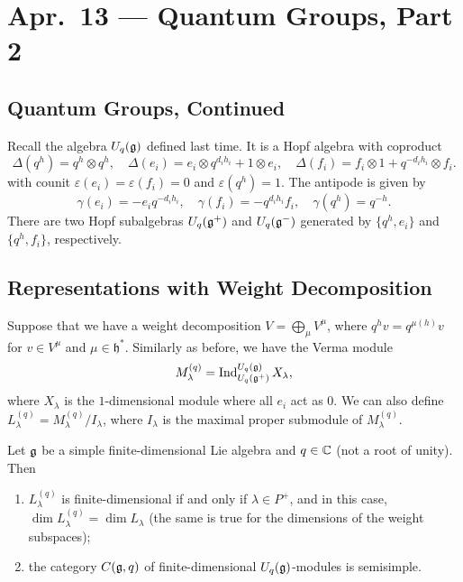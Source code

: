 \chapter{Apr.~13 --- Quantum Groups, Part 2}

\section{Quantum Groups, Continued}

\begin{remark}
  Recall the algebra $U_q(\mathfrak{g})$ defined last time.
  It is a Hopf algebra with coproduct
  \[
    \Delta(q^h)
    = q^h \otimes q^h, \quad
    \Delta(e_i)
    = e_i \otimes q^{d_i h_i} + 1 \otimes e_i,
    \quad \Delta(f_i)
    = f_i \otimes 1 + q^{-d_i h_i} \otimes f_i.
  \]
  with counit $\varepsilon(e_i) = \varepsilon(f_i) = 0$ and $\varepsilon(q^h) = 1$.
  The antipode is given by
  \[
    \gamma(e_i)
    = -e_i q^{-d_i h_i}, \quad
    \gamma(f_i) = -q^{d_i h_i} f_i, \quad
    \gamma(q^h) = q^{-h}.
  \]
  There are two Hopf subalgebras
  $U_q(\mathfrak{g}^+)$ and $U_q(\mathfrak{g}^-)$ generated by
  $\{q^h, e_i\}$ and $\{q^h, f_i\}$, respectively.
\end{remark}

\section{Representations with Weight Decomposition}

\begin{remark}
  Suppose that we have a weight decomposition
  $V = \bigoplus_\mu V^\mu$, where
  $q^h v = q^{\mu(h)} v$ for $v \in V^\mu$
  and $\mu \in \mathfrak{h}^*$.
  Similarly as before, we have the Verma module
  \[
    M_\lambda^{(q)}
    = \operatorname{Ind}^{U_q(\mathfrak{g})}_{U_q(\mathfrak{g}^+)} X_\lambda,
  \]
  where $X_\lambda$ is the $1$-dimensional
  module where all $e_i$ act as $0$.
  We can also define
  $L_\lambda^{(q)} = M_{\lambda}^{(q)} / I_\lambda$,
  where $I_\lambda$ is the maximal proper
  submodule of $M_\lambda^{(q)}$.
\end{remark}

\begin{theorem}
  Let $\mathfrak{g}$ be a simple finite-dimensional
  Lie algebra and $q \in \mathbb{C}$ (not a root
  of unity). Then
  \begin{enumerate}
    \item $L_\lambda^{(q)}$ is finite-dimensional
      if and only if $\lambda \in P^+$, and
      in this case,
      $\dim L_\lambda^{(q)} = \dim L_\lambda$
      (the same is true for the dimensions
      of the weight subspaces);
    \item the category $C(\mathfrak{g}, q)$ of
      finite-dimensional $U_q(\mathfrak{g})$-modules is
      semisimple.
  \end{enumerate}
\end{theorem}

